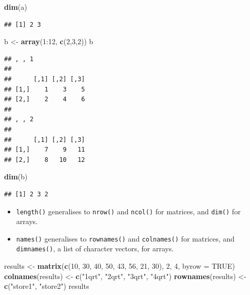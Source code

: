 \documentclass[]{book}
\newenvironment{Shaded}{\begin{snugshade}}{\end{snugshade}}
\newcommand{\KeywordTok}[1]{\textcolor[rgb]{0.13,0.29,0.53}{\textbf{{#1}}}}
\newcommand{\DataTypeTok}[1]{\textcolor[rgb]{0.13,0.29,0.53}{{#1}}}
\newcommand{\DecValTok}[1]{\textcolor[rgb]{0.00,0.00,0.81}{{#1}}}
\newcommand{\StringTok}[1]{\textcolor[rgb]{0.31,0.60,0.02}{{#1}}}
\newcommand{\OtherTok}[1]{\textcolor[rgb]{0.56,0.35,0.01}{{#1}}}
\newcommand{\NormalTok}[1]{{#1}}
\providecommand{\tightlist}{%
  \setlength{\itemsep}{0pt}\setlength{\parskip}{0pt}}
\begin{document}
\begin{Shaded}
\begin{Highlighting}[]
\KeywordTok{dim}\NormalTok{(a)}
\end{Highlighting}
\end{Shaded}

\begin{verbatim}
## [1] 2 3
\end{verbatim}

\begin{Shaded}
\begin{Highlighting}[]
\NormalTok{b <-}\StringTok{ }\KeywordTok{array}\NormalTok{(}\DecValTok{1}\NormalTok{:}\DecValTok{12}\NormalTok{, }\KeywordTok{c}\NormalTok{(}\DecValTok{2}\NormalTok{,}\DecValTok{3}\NormalTok{,}\DecValTok{2}\NormalTok{))}
\NormalTok{b}
\end{Highlighting}
\end{Shaded}

\begin{verbatim}
## , , 1
## 
##      [,1] [,2] [,3]
## [1,]    1    3    5
## [2,]    2    4    6
## 
## , , 2
## 
##      [,1] [,2] [,3]
## [1,]    7    9   11
## [2,]    8   10   12
\end{verbatim}

\begin{Shaded}
\begin{Highlighting}[]
\KeywordTok{dim}\NormalTok{(b)}
\end{Highlighting}
\end{Shaded}

\begin{verbatim}
## [1] 2 3 2
\end{verbatim}

\begin{itemize}
\tightlist
\item
  \texttt{length()} generalises to \texttt{nrow()} and \texttt{ncol()}
  for matrices, and \texttt{dim()} for arrays.
\item
  \texttt{names()} generalises to \texttt{rownames()} and
  \texttt{colnames()} for matrices, and \texttt{dimnames()}, a list of
  character vectors, for arrays.
\end{itemize}

\begin{Shaded}
\begin{Highlighting}[]
\NormalTok{results <-}\StringTok{ }\KeywordTok{matrix}\NormalTok{(}\KeywordTok{c}\NormalTok{(}\DecValTok{10}\NormalTok{, }\DecValTok{30}\NormalTok{, }\DecValTok{40}\NormalTok{, }\DecValTok{50}\NormalTok{, }\DecValTok{43}\NormalTok{, }\DecValTok{56}\NormalTok{, }\DecValTok{21}\NormalTok{, }\DecValTok{30}\NormalTok{), }\DecValTok{2}\NormalTok{, }\DecValTok{4}\NormalTok{, }\DataTypeTok{byrow =} \OtherTok{TRUE}\NormalTok{)}
\KeywordTok{colnames}\NormalTok{(results) <-}\StringTok{ }\KeywordTok{c}\NormalTok{(}\StringTok{"1qrt"}\NormalTok{, }\StringTok{"2qrt"}\NormalTok{, }\StringTok{"3qrt"}\NormalTok{, }\StringTok{"4qrt"}\NormalTok{)}
\KeywordTok{rownames}\NormalTok{(results) <-}\StringTok{ }\KeywordTok{c}\NormalTok{(}\StringTok{"store1"}\NormalTok{, }\StringTok{"store2"}\NormalTok{)}
\NormalTok{results}
\end{Highlighting}
\end{Shaded}
\end{document}
